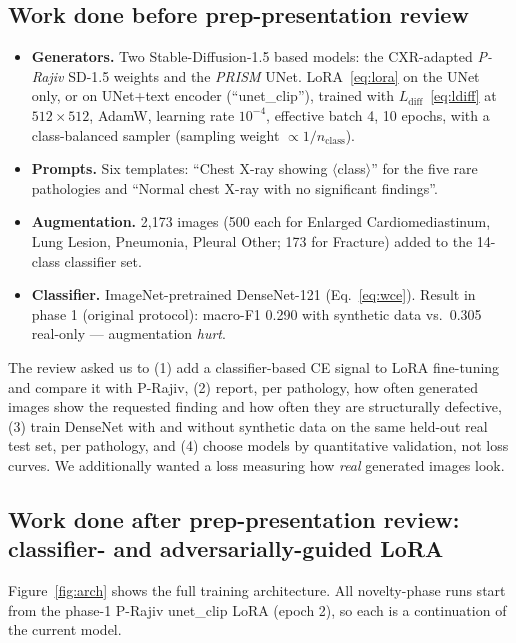 \documentclass[twoside,english]{article}
\begin{document}
\subsection{Work done before prep-presentation review}\label{sec:phase1}
\begin{itemize}\setlength\itemsep{0pt}
\item \textbf{Generators.} Two Stable-Diffusion-1.5 based models: the CXR-adapted \emph{P-Rajiv} SD-1.5 weights and the \emph{PRISM} UNet. LoRA~\eqref{eq:lora} on the UNet only, or on UNet+text encoder (``unet\_clip''), trained with $L_{\text{diff}}$~\eqref{eq:ldiff} at $512\times512$, AdamW, learning rate $10^{-4}$, effective batch 4, 10 epochs, with a class-balanced sampler (sampling weight $\propto 1/n_{\text{class}}$).
\item \textbf{Prompts.} Six templates: ``Chest X-ray showing $\langle$class$\rangle$'' for the five rare pathologies and ``Normal chest X-ray with no significant findings''.
\item \textbf{Augmentation.} 2{,}173 images (500 each for Enlarged Cardiomediastinum, Lung Lesion, Pneumonia, Pleural Other; 173 for Fracture) added to the 14-class classifier set.
\item \textbf{Classifier.} ImageNet-pretrained DenseNet-121 (Eq.~\eqref{eq:wce}). Result in phase 1 (original protocol): macro-F1 0.290 with synthetic data vs.\ 0.305 real-only --- augmentation \emph{hurt}.
\end{itemize}
The review asked us to (1) add a classifier-based CE signal to LoRA fine-tuning and compare it with P-Rajiv, (2) report, per pathology, how often generated images show the requested finding and how often they are structurally defective, (3) train DenseNet with and without synthetic data on the same held-out real test set, per pathology, and (4) choose models by quantitative validation, not loss curves. We additionally wanted a loss measuring how \emph{real} generated images look.

\subsection{Work done after prep-presentation review: classifier- and adversarially-guided LoRA}\label{sec:novel}
Figure~\ref{fig:arch} shows the full training architecture. All novelty-phase runs start from the phase-1 P-Rajiv unet\_clip LoRA (epoch 2), so each is a continuation of the current model.
\end{document}
